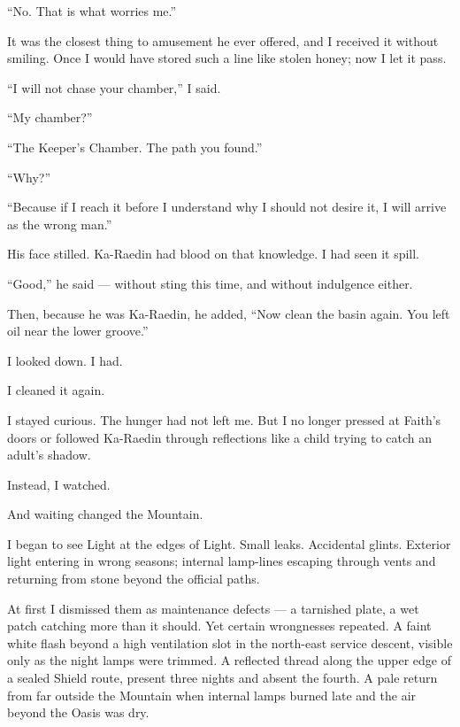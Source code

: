 ``No. That is what worries me.''\par

It was the closest thing to amusement he ever offered, and I received it without smiling. Once I would have stored such a line like stolen honey; now I let it pass.\par

``I will not chase your chamber,'' I said.\par

``My chamber?''\par

``The Keeper's Chamber. The path you found.''\par

``Why?''\par

``Because if I reach it before I understand why I should not desire it, I will arrive as the wrong man.''\par

His face stilled. Ka-Raedin had blood on that knowledge. I had seen it spill.\par

``Good,'' he said --- without sting this time, and without indulgence either.\par

Then, because he was Ka-Raedin, he added, ``Now clean the basin again. You left oil near the lower groove.''\par

I looked down. I had.\par

I cleaned it again.\par

I stayed curious. The hunger had not left me. But I no longer pressed at Faith's doors or followed Ka-Raedin through reflections like a child trying to catch an adult's shadow.\par

Instead, I watched.\par

And waiting changed the Mountain.\par

I began to see Light at the edges of Light. Small leaks. Accidental glints. Exterior light entering in wrong seasons; internal lamp-lines escaping through vents and returning from stone beyond the official paths.\par

At first I dismissed them as maintenance defects --- a tarnished plate, a wet patch catching more than it should. Yet certain wrongnesses repeated. A faint white flash beyond a high ventilation slot in the north-east service descent, visible only as the night lamps were trimmed. A reflected thread along the upper edge of a sealed Shield route, present three nights and absent the fourth. A pale return from far outside the Mountain when internal lamps burned late and the air beyond the Oasis was dry.\par

